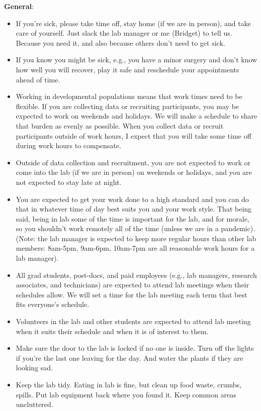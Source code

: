 \documentclass[]{book}
\providecommand{\tightlist}{%
  \setlength{\itemsep}{0pt}\setlength{\parskip}{0pt}}
\begin{document}
\textbf{General}:

\begin{itemize}
\tightlist
\item
  If you're sick, please take time off, stay home (if we are in person), and take care of yourself. Just slack the lab manager or me (Bridget) to tell us. Because you need it, and also because others don't need to get sick.
\item
  If you know you might be sick, e.g., you have a minor surgery and don't know how well you will recover, play it safe and reschedule your appointments ahead of time.
\item
  Working in developmental populations means that work times need to be flexible. If you are collecting data or recruiting participants, you may be expected to work on weekends and holidays. We will make a schedule to share that burden as evenly as possible. When you collect data or recruit participants outside of work hours, I expect that you will take some time off during work hours to compensate.
\item
  Outside of data collection and recruitment, you are not expected to work or come into the lab (if we are in person) on weekends or holidays, and you are not expected to stay late at night.
\item
  You are expected to get your work done to a high standard and you can do that in whatever time of day best suits you and your work style. That being said, being in lab some of the time is important for the lab, and for morale, so you shouldn't work remotely all of the time (unless we are in a pandemic). (Note: the lab manager is expected to keep more regular hours than other lab members: 8am-5pm, 9am-6pm, 10am-7pm are all reasonable work hours for a lab manager).
\item
  All grad students, post-docs, and paid employees (e.g., lab managers, research associates, and technicians) are expected to attend lab meetings when their schedules allow. We will set a time for the lab meeting each term that best fits everyone's schedule.
\item
  Volunteers in the lab and other students are expected to attend lab meeting when it suits their schedule and when it is of interest to them.
\item
  Make sure the door to the lab is locked if no one is inside. Turn off the lights if you're the last one leaving for the day. And water the plants if they are looking sad.
\item
  Keep the lab tidy. Eating in lab is fine, but clean up food waste, crumbs, spills. Put lab equipment back where you found it. Keep common areas uncluttered.

\end{itemize}
\end{document}
